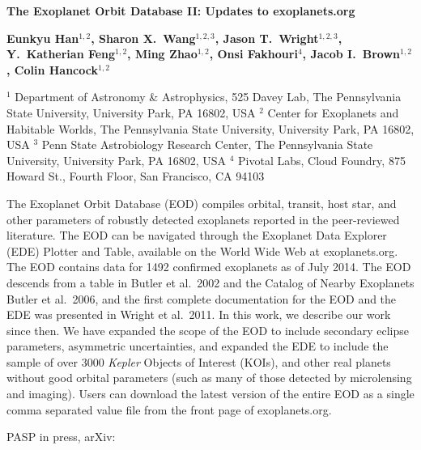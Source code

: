 {\large\bf{The Exoplanet Orbit Database \textsc{II}: Updates to
  exoplanets.org}

{\bf{Eunkyu Han$^{1,2}$, Sharon X.~Wang$^{1,2,3}$, Jason T.~Wright$^{1,2,3}$, Y.\
  Katherian Feng$^{1,2}$, Ming Zhao$^{1,2}$, Onsi
  Fakhouri$^{4}$, Jacob I.\ Brown$^{1,2}$, Colin Hancock$^{1,2}$}} 

$^1$ {Department of Astronomy \& Astrophysics, 525 Davey
  Lab, The Pennsylvania State University, University Park, PA 16802, USA}
$^2$ {Center for Exoplanets and Habitable Worlds, The
  Pennsylvania State University, University Park, PA 16802, USA}
$^3$ {Penn State Astrobiology Research Center, The
  Pennsylvania State University, University Park, PA 16802, USA}
$^4$ {Pivotal Labs, Cloud Foundry, 875 Howard St., Fourth
  Floor, San Francisco, CA 94103}  

{The Exoplanet Orbit Database (EOD) compiles orbital, transit, host
star, and other parameters of robustly detected exoplanets reported in
the peer-reviewed literature. The EOD can be navigated through the
Exoplanet Data Explorer (EDE) Plotter and Table, available on the
World Wide Web at exoplanets.org. The EOD contains data for 1492
confirmed exoplanets as of July 2014.  The EOD descends from a table
in Butler et al.\ 2002 and the Catalog of Nearby Exoplanets
Butler et al.\ 2006, and the first complete documentation for the EOD
and the EDE was presented in Wright et al.\ 2011. In this work, we
describe our work since then.  We have expanded the scope of the EOD
to include secondary eclipse parameters, asymmetric uncertainties, and
expanded the EDE to include the sample of over 3000 \textit{Kepler} Objects
of Interest (KOIs), and other real planets without good orbital
parameters (such as many of those detected by microlensing and
imaging). Users can download the latest version of the entire EOD as a
single comma separated value file from the front page of
exoplanets.org.}

{ PASP in press, arXiv: }

}
